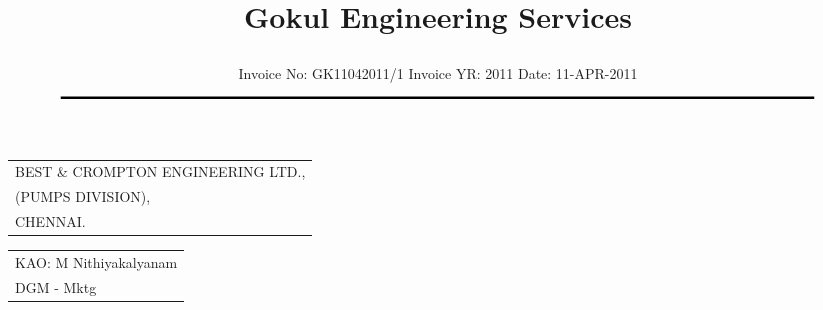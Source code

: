 \documentclass[11pt]{article}
\title{\vspace*{1cm} \centerline{ \Huge { \bf \hspace{0cm} Gokul Engineering Services}\vspace*{-0.5cm}}}
\author{%
 \scriptsize Invoice No: GK11042011/1  \hspace*{4cm}  Invoice YR: 2011 \hspace*{4cm} Date:  11-APR-2011\\
$\rule{7.5in}{0.5mm}$}
\date{}
\begin{document}
\maketitle
\thispagestyle{empty}
\vspace*{0cm}	
\begin{flushleft}
{\footnotesize{
\begin{tabular}{l}
BEST \& CROMPTON ENGINEERING LTD.,\\
(PUMPS DIVISION),\\
CHENNAI.\\
\end{tabular}
}}
\end{flushleft}

\vspace*{-1cm}
\vspace*{-20pt}

\begin{flushright}
\begin{tabular}{l}
 KAO: M Nithiyakalyanam \\
 DGM - Mktg
\end{tabular}
\end{flushright}
\vspace{1cm}

\end{document}
